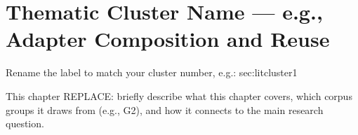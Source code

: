 \section{Thematic Cluster Name — e.g., Adapter Composition and Reuse}
\label{sec:lit_cluster_N}
 Rename the label to match your cluster number, e.g.:
   sec:litcluster1

This chapter REPLACE: briefly describe what this chapter covers, which corpus
groups it draws from (e.g., G2), and how it connects to the main research question.

 